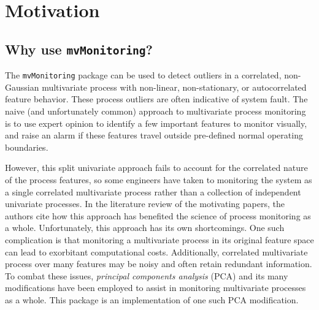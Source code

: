 \documentclass{report}\usepackage[]{graphicx}\usepackage[]{color}
\begin{document}

\section{Motivation} \label{sec:D_Motivation}

\subsection{Why use \texttt{mvMonitoring}?}
The \texttt{mvMonitoring} package can be used to detect outliers in a correlated, non-Gaussian multivariate process with non-linear, non-stationary, or autocorrelated feature behavior. These process outliers are often indicative of system fault. The naive (and unfortunately common) approach to multivariate process monitoring is to use expert opinion to identify a few important features to monitor visually, and raise an alarm if these features travel outside pre-defined normal operating boundaries.

However, this split univariate approach fails to account for the correlated nature of the process features, so some engineers have taken to monitoring the system as a single correlated multivariate process rather than a collection of independent univariate processes. In the literature review of the motivating papers, the authors cite how this approach has benefited the science of process monitoring as a whole. Unfortunately, this approach has its own shortcomings. One such complication is that monitoring a multivariate process in its original feature space can lead to exorbitant computational costs. Additionally, correlated multivariate process over many features may be noisy and often retain redundant information. To combat these issues, \emph{principal components analysis} (PCA) and its many modifications have been employed to assist in monitoring multivariate processes as a whole. This package is an implementation of one such PCA modification.
\end{document}
